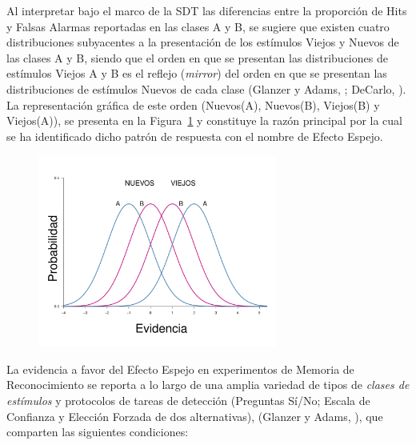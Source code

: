 Al interpretar bajo el marco de la SDT las diferencias entre la proporción de Hits y Falsas Alarmas reportadas en las clases A y B, se sugiere que existen cuatro distribuciones subyacentes a la presentación de los estímulos Viejos y Nuevos de las clases A y B, siendo que el orden en que se presentan las distribuciones de estímulos Viejos A y B es el reflejo (\textit{mirror}) del orden en que se presentan las distribuciones de estímulos Nuevos de cada clase (Glanzer y Adams, \citeyear{Glanzer1990}; DeCarlo, \citeyear{DeCarlo2007}). La representación gráfica de este orden (Nuevos(A), Nuevos(B), Viejos(B) y Viejos(A)), se presenta en la Figura~\ref{fig:Ejem_EfectoEspejo} y constituye la razón principal por la cual se ha identificado dicho patrón de respuesta con el nombre de Efecto Espejo.\\

\begin{figure}[th]
\centering
\includegraphics[width=0.7\textwidth]{Figures/EfectoEspejo}
\caption[Representación gráfica del Efecto Espejo]{}
\label{fig:Ejem_EfectoEspejo}
\end{figure}

La evidencia a favor del Efecto Espejo en experimentos de Memoria de Reconocimiento se reporta a lo largo de una amplia variedad de tipos de \textit{clases de estímulos} y protocolos de tareas de detección (Preguntas Sí/No; Escala de Confianza y Elección Forzada de dos alternativas), (Glanzer y Adams, \citeyear{Glanzer1990}), que comparten las siguientes condiciones:\\

